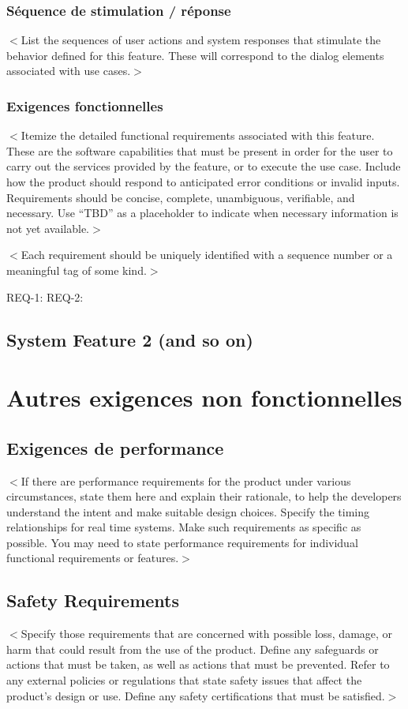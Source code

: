\documentclass[titlepage]{report}
\begin{document}
\subsection{Séquence de stimulation / réponse}
$<$List the sequences of user actions and system responses that stimulate the 
behavior defined for this feature. These will correspond to the dialog elements 
associated with use cases.$>$

\subsection{Exigences fonctionnelles}
$<$Itemize the detailed functional requirements associated with this feature.  
These are the software capabilities that must be present in order for the user 
to carry out the services provided by the feature, or to execute the use case.  
Include how the product should respond to anticipated error conditions or 
invalid inputs. Requirements should be concise, complete, unambiguous, 
verifiable, and necessary. Use “TBD” as a placeholder to indicate when necessary 
information is not yet available.$>$

$<$Each requirement should be uniquely identified with a sequence number or a 
meaningful tag of some kind.$>$

REQ-1:	REQ-2:

\section{System Feature 2 (and so on)}


\chapter{Autres exigences non fonctionnelles}

\section{Exigences de performance}
$<$If there are performance requirements for the product under various 
circumstances, state them here and explain their rationale, to help the 
developers understand the intent and make suitable design choices. Specify the 
timing relationships for real time systems. Make such requirements as specific 
as possible. You may need to state performance requirements for individual 
functional requirements or features.$>$

\section{Safety Requirements}
$<$Specify those requirements that are concerned with possible loss, damage, or 
harm that could result from the use of the product. Define any safeguards or 
actions that must be taken, as well as actions that must be prevented. Refer to 
any external policies or regulations that state safety issues that affect the 
product’s design or use. Define any safety certifications that must be 
satisfied.$>$
\end{document}
